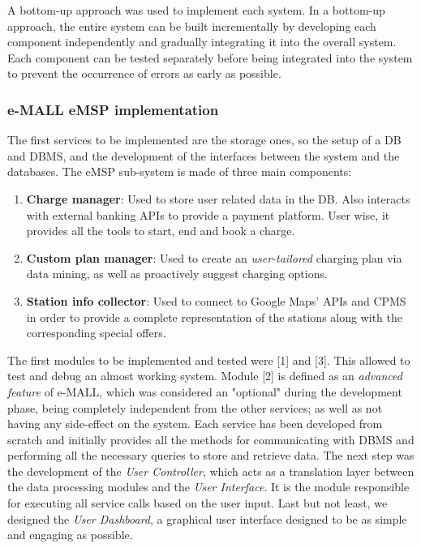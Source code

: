 \documentclass[12pt]{report}
\begin{document}
\noindent A bottom-up approach was used to implement each system. In a bottom-up approach, the entire system can be built incrementally by developing each component independently and gradually integrating it into the overall system. Each component can be tested separately before being integrated into the system to prevent the occurrence of errors as early as possible.\\

\bigskip
\subsubsection{e-MALL eMSP implementation}
The first services to be implemented are the storage ones, so the setup of a DB and DBMS, and the development of the interfaces between the system and the databases.\newline
The eMSP sub-system is made of three main components:
\begin{enumerate}
    \item\textbf{Charge manager}: Used to store user related data in the DB. Also interacts with external banking APIs to provide a payment platform.\newline
    User wise, it provides all the tools to start, end and book a charge.    
    \item\textbf{Custom plan manager}: Used to create an \emph{user-tailored} charging plan via data mining, as well as proactively suggest charging options.
    \item\textbf{Station info collector}: Used to connect to Google Maps' APIs and CPMS in order to provide a complete representation of the stations along with the corresponding special offers.
\end{enumerate}

\noindent The first modules to be implemented and tested were [1] and [3]. This allowed to test and debug an almost working system. Module [2] is defined as an \emph{advanced feature} of e-MALL, which was considered an "optional" during the development phase, being completely independent from the other services; as well as not having any side-effect on the system.\newline
Each service has been developed from scratch and initially provides all the methods for communicating with DBMS and performing all the necessary queries to store and retrieve data.\newline
The next step was the development of the \emph{User Controller}, which acts as a translation layer between the data processing modules and the \emph{User Interface}. It is the module responsible for executing all service calls based on the user input.\newline
Last but not least, we designed the \emph{User Dashboard}, a graphical user interface designed to be as simple and engaging as possible.\\
\end{document}
